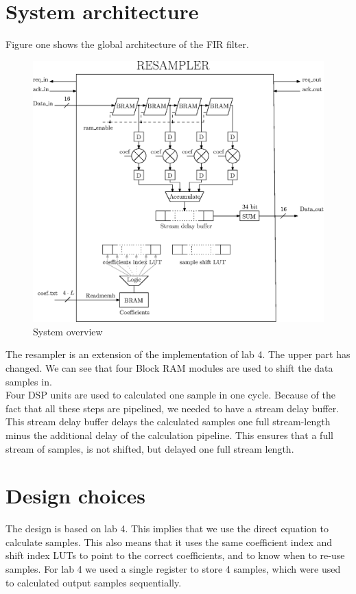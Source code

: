 \documentclass[a4paper,twoside,11pt, fleqn]{article}
\begin{document}
\newpage
\section{System architecture}
Figure one shows the global architecture of the FIR filter. 
\begin{figure}[h]
	\includegraphics[scale = 0.85]{Images/5_blockdiagram}
    \caption{System overview}
\end{figure}

The resampler is an extension of the implementation of lab 4. The upper part has changed. We can see that four Block RAM modules are used to shift the data samples in.\\

Four DSP units are used to calculated one sample in one cycle. Because of the fact that all these steps are pipelined, we needed to have a stream delay buffer. This stream delay buffer delays the calculated samples one full stream-length minus the additional delay of the calculation pipeline. This ensures that a full stream of samples, is not shifted, but delayed one full stream length.

\newpage
\section{Design choices}
The design is based on lab 4. This implies that we use the direct equation to calculate samples. This also means that it uses the same coefficient index and shift index LUTs to point to the correct coefficients, and to know when to re-use samples. For lab 4 we used a single register to store 4 samples, which were used to calculated output samples sequentially.\\
\end{document}
